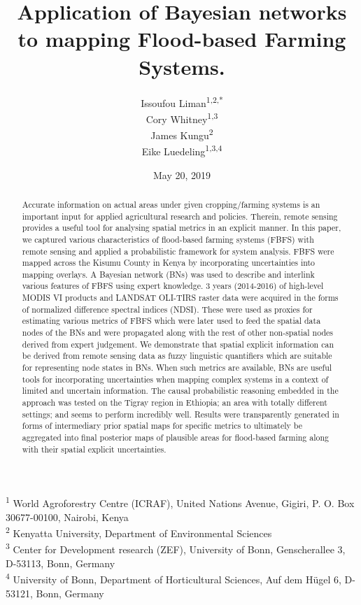 \documentclass[12pt,oneside]{article}
\title{Application of Bayesian networks to mapping Flood-based Farming Systems.}
\author{Issoufou Liman\textsuperscript{1,2,*} \\ Cory Whitney\textsuperscript{1,3} \\ James Kungu\textsuperscript{2} \\ Eike Luedeling\textsuperscript{1,3,4}}
\date{May 20, 2019}
\begin{document}
\maketitle
\begin{abstract}
Accurate information on actual areas under given cropping/farming
systems is an important input for applied agricultural research and
policies. Therein, remote sensing provides a useful tool for analysing
spatial metrics in an explicit manner. In this paper, we captured
various characteristics of flood-based farming systems (FBFS) with
remote sensing and applied a probabilistic framework for system
analysis. FBFS were mapped across the Kisumu County in Kenya by
incorporating uncertainties into mapping overlays. A Bayesian network
(BNs) was used to describe and interlink various features of FBFS using
expert knowledge. 3 years (2014-2016) of high-level MODIS VI products
and LANDSAT OLI-TIRS raster data were acquired in the forms of
normalized difference spectral indices (NDSI). These were used as
proxies for estimating various metrics of FBFS which were later used to
feed the spatial data nodes of the BNs and were propagated along with
the rest of other non-spatial nodes derived from expert judgement. We
demonstrate that spatial explicit information can be derived from remote
sensing data as fuzzy linguistic quantifiers which are suitable for
representing node states in BNs. When such metrics are available, BNs
are useful tools for incorporating uncertainties when mapping complex
systems in a context of limited and uncertain information. The causal
probabilistic reasoning embedded in the approach was tested on the
Tigray region in Ethiopia; an area with totally different settings; and
seems to perform incredibly well. Results were transparently generated
in forms of intermediary prior spatial maps for specific metrics to
ultimately be aggregated into final posterior maps of plausible areas
for flood-based farming along with their spatial explicit uncertainties.
\end{abstract}

{
\hypersetup{linkcolor=black}
\setcounter{tocdepth}{5}
\tableofcontents
}
\textsuperscript{1} World Agroforestry Centre (ICRAF), United Nations
Avenue, Gigiri, P. O. Box 30677-00100, Nairobi, Kenya\\
\textsuperscript{2} Kenyatta University, Department of Environmental
Sciences\\
\textsuperscript{3} Center for Development research (ZEF), University of
Bonn, Genscherallee 3, D-53113, Bonn, Germany\\
\textsuperscript{4} University of Bonn, Department of Horticultural
Sciences, Auf dem Hügel 6, D-53121, Bonn, Germany
\end{document}
